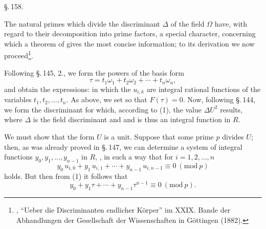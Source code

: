 
\begin{center}
\S.\,158.

\end{center}

The natural primes which divide the discriminant $\Delta$ of the field $\Omega$ have, with regard to their decomposition into prime factors, a special character, concerning which a theorem of  gives the most concise information; to its derivation we now proceed\footnote{, ``Ueber die Discriminanten endlicher K\"orper'' im XXIX. Bande der Abhandlungen der Gesellschaft der Wissenschaften in G\"ottingen (1882).}.

Following \S.\,145, 2., we form the powers of the basis form
\[
\tau = t_1\omega_1 + t_2\omega_2 + \cdots + t_n\omega_n,
\]
and obtain the expressions:
in which the $u_{i,k}$ are integral rational functions of the variables $t_1, t_2, \ldots, t_n$. As above, we set
so that $F(\tau)=0$. Now, following \S.\,144, we form the discriminant
for which, according to (1), the value $\Delta U^2$ results, where $\Delta$ is the field discriminant and
and is thus an integral function in $R$.

We must show that the form $U$ is a unit. Suppose that some prime $p$ divides $U$; then, as was already proved in \S.\,147, we can determine a system of integral functions $y_0, y_1, \ldots, y_{n-1}$ in $R$, , in such a way that for $i=1,2,\ldots,n$
\[
y_0\, u_{i,0} + y_1\, u_{i,1} + \cdots + y_{n-1}\, u_{i,n-1} \equiv 0\ (\mathrm{mod}\ p)
\]
holds. But then from (1) it follows that
\[
y_0 + y_1\tau + \cdots + y_{n-1}\tau^{n-1} \equiv 0\ (\mathrm{mod}\ p).
\]
